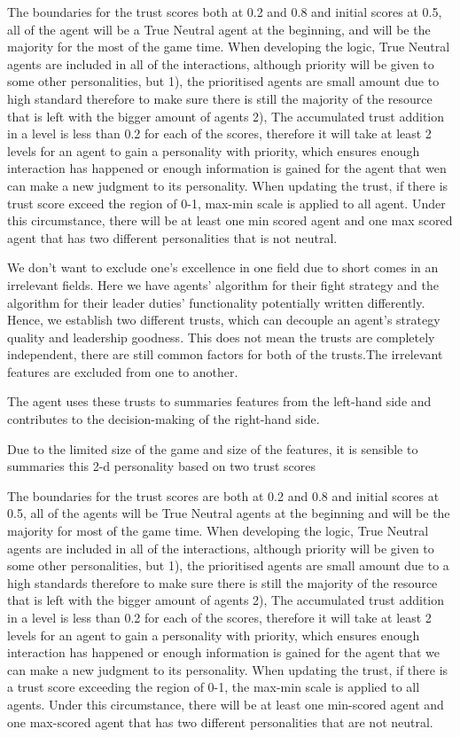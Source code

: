 The boundaries for the trust scores both at 0.2 and 0.8 and initial scores at 0.5, all of the agent will be a True Neutral agent at the beginning, and will be the majority for the most of the game time. When developing the logic, True Neutral agents are included in all of the interactions, although priority will be given to some other personalities, but 1), the prioritised agents are small amount due to high standard therefore to make sure there is still the majority of the resource that is left with the bigger amount of agents 2), The accumulated trust addition in a level is less than 0.2 for each of the scores, therefore it will take at least 2 levels for an agent to gain a personality with priority, which ensures enough interaction has happened or enough information is gained for the agent that wen can make a new judgment to its personality. When updating the trust, if there is trust score exceed the region of 0-1, max-min scale is applied to all agent. Under this circumstance, there will be at least one min scored agent and one max scored agent that has two different personalities that is not neutral. 

We don’t want to exclude one’s excellence in one field due to short comes in an irrelevant fields.
Here we have agents’ algorithm for their fight strategy and the algorithm for their leader duties’ functionality potentially written differently. 
Hence, we establish two different trusts, which can decouple an agent’s strategy quality and leadership goodness. This does not mean the trusts are completely independent, there are still common factors for both of the trusts.The irrelevant features are excluded from one to another.

The agent uses these trusts to summaries features from the left-hand side and contributes to the decision-making of the right-hand side. 

Due to the limited size of the game and size of the features, it is sensible to summaries this 2-d personality based on two trust scores

The boundaries for the trust scores are both at 0.2 and 0.8 and initial scores at 0.5, all of the agents will be True Neutral agents at the beginning and will be the majority for most of the game time. When developing the logic, True Neutral agents are included in all of the interactions, although priority will be given to some other personalities, but 1), the prioritised agents are small amount due to a high standards therefore to make sure there is still the majority of the resource that is left with the bigger amount of agents 2), The accumulated trust addition in a level is less than 0.2 for each of the scores, therefore it will take at least 2 levels for an agent to gain a personality with priority, which ensures enough interaction has happened or enough information is gained for the agent that we can make a new judgment to its personality. When updating the trust, if there is a trust score exceeding the region of 0-1, the max-min scale is applied to all agents. Under this circumstance, there will be at least one min-scored agent and one max-scored agent that has two different personalities that are not neutral. 

